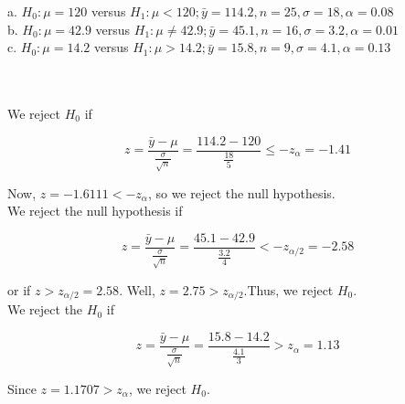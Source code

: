 a. $H_0:\mu=120$ versus $H_1:\mu<120; \bar{y}=114.2, n = 25, \sigma=18, \alpha=0.08$\\

b. $H_0:\mu=42.9$ versus $H_1:\mu\neq42.9; \bar{y}=45.1, n=16, \sigma=3.2, \alpha=0.01$\\

c. $H_0:\mu=14.2$ versus $H_1:\mu>14.2; \bar{y}=15.8, n=9, \sigma=4.1, \alpha=0.13$\\\\

\begin{solution}\renewcommand{\qedsymbol}{}\ \\
    We reject $H_0$ if
    
    $$z=\frac{\bar{y}-\mu}{\frac{\sigma}{\sqrt{n}}}=\frac{114.2-120}{\frac{18}{5}}\leq -z_{\alpha}
    =-1.41$$
    
    Now, $z=-1.6111<-z_{\alpha}$, so we reject the null hypothesis.\\
    We reject the null hypothesis if
    
    $$z=\frac{\bar{y}-\mu}{\frac{\sigma}{\sqrt{n}}}=\frac{45.1-42.9}{\frac{3.2}{4}}<-z_{\alpha/2}
    =-2.58$$
    
    or if $z>z_{\alpha/2}=2.58$. Well, $z=2.75>z_{\alpha/2}$.Thus, we reject $H_0$.\\
    We reject the $H_0$ if
    
    $$z=\frac{\bar{y}-\mu}{\frac{\sigma}{\sqrt{n}}}=\frac{15.8-14.2}{\frac{4.1}{3}}>z_{\alpha}=1.13$$
    
    Since $z=1.1707>z_{\alpha}$, we reject $H_0$.

\end{solution}